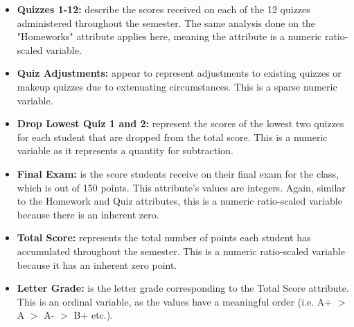 \documentclass{article}
\begin{document}
\begin{itemize}
    \item \textbf{Quizzes 1-12:} describe the scores received on each of the 12 quizzes administered throughout the semester. The same analysis done on the "Homeworks" attribute applies here, meaning the attribute is a numeric ratio-scaled variable. 
    \item \textbf{Quiz Adjustments:} appear to represent adjustments to existing quizzes or makeup quizzes due to extenuating circumstances. This is a sparse numeric variable. 
    \item \textbf{Drop Lowest Quiz 1 and 2:} represent the scores of the lowest two quizzes for each student that are dropped from the total score. This is a numeric variable as it represents a quantity for subtraction.
    \item \textbf{Final Exam:} is the score students receive on their final exam for the class, which is out of 150 points. This attribute's values are integers. Again, similar to the Homework and Quiz attributes, this is a numeric ratio-scaled variable because there is an inherent zero. 
    \item \textbf{Total Score:} represents the total number of points each student has accumulated throughout the semester. This is a numeric ratio-scaled variable because it has an inherent zero point. 
    \item \textbf{Letter Grade:} is the letter grade corresponding to the Total Score attribute. This is an ordinal variable, as the values have a meaningful order (i.e. A+ $>$ A $>$ A- $>$ B+ etc.). 
\end{itemize}
\end{document}
